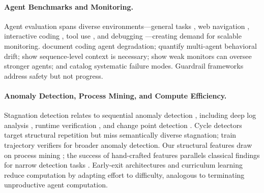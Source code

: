 \paragraph{Agent Benchmarks and Monitoring.}
Agent evaluation spans diverse environments---general tasks \citep{liu2024agentbench}, web navigation \citep{zhou2024webarena}, interactive coding \citep{yang2024intercode}, tool use \citep{qin2024toolllm}, and debugging \citep{tian2024debugbench}---creating demand for scalable monitoring.
\citet{orlanski2026slopcodebench} document coding agent degradation; \citet{rath2026agentdrift} quantify multi-agent behavioral drift; \citet{chen2025monitoring} show sequence-level context is necessary; \citet{kale2025weaktostrong} show weak monitors can oversee stronger agents; and \citet{cemri2025multiagentfail,zhu2025agentfail} catalog systematic failure modes.
Guardrail frameworks \citep{rebedea2023nemo,xiang2024guardagent,wang2025probguard} address safety but not progress.

\paragraph{Anomaly Detection, Process Mining, and Compute Efficiency.}
Stagnation detection relates to sequential anomaly detection \citep{chandola2009anomaly}, including deep log analysis \citep{du2017deeplog,meng2019loganomaly}, runtime verification \citep{leucker2009runtime}, and change point detection \citep{aminikhanghahi2017changepoint,adams2007bayesian}.
Cycle detectors \citep{george2025cycledetection,pipis2025reasoningloop} target structural repetition but miss semantically diverse stagnation; \citet{liu2026trajad} train trajectory verifiers for broader anomaly detection.
Our structural features draw on process mining \citep{vanderaalst2016processmining}; the success of hand-crafted features parallels classical findings for narrow detection tasks \citep{liu2008isolationforest}.
Early-exit architectures \citep{teerapittayanon2016branchynet,schwartz2020righttool} and curriculum learning \citep{bengio2009curriculum} reduce computation by adapting effort to difficulty, analogous to terminating unproductive agent computation.
